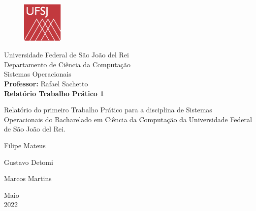 \documentclass[a4paper, 12pt]{article}
\begin{document}

\begin{titlepage}
	\begin{center}
	
	\begin{figure}[!ht]
	\centering
	\includegraphics[width=2cm]{docs/images/ufsj.png}
	\end{figure}

		\LARGE{Universidade Federal de São João del Rei}\\
		\large{Departamento de Ciência da Computação}\\ 
		\large{Sistemas Operacionais}\\
		\large{\textbf{Professor:} Rafael Sachetto} \\
		\vspace{15pt}
        \vspace{95pt}
        \textbf{\LARGE{Relatório Trabalho Prático 1}}\\
		\vspace{3,5cm}
	\end{center}
	
	\begin{flushright}
   \begin{list}{}{
      \setlength{\leftmargin}{4.5cm}
      \setlength{\rightmargin}{0cm}
      \setlength{\labelwidth}{0pt}
      \setlength{\labelsep}{\leftmargin}}

      \item Relatório do primeiro Trabalho Prático para a disciplina de Sistemas Operacionais do Bacharelado em Ciência da Computação da Universidade Federal de São João del Rei.

      \begin{list}{}{
      \setlength{\leftmargin}{0cm}
      \setlength{\rightmargin}{0cm}
      \setlength{\labelwidth}{0pt}
      \setlength{\labelsep}{\leftmargin}}

			\item \hfill Filipe Mateus \
            \item \hfill Gustavo Detomi \
      		\item \hfill Marcos Martins \

      \end{list}
   \end{list}
 \end{flushright}
	\vspace{1cm}
	
	\begin{center}
		\vspace{\fill}
			 Maio\\
		 2022
			\end{center}
\end{titlepage}
\end{document}
